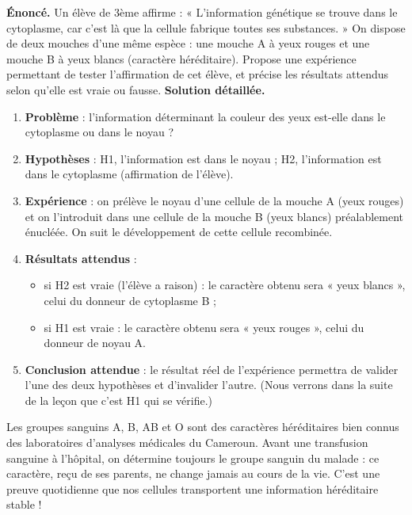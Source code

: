 \documentclass[11pt]{article}
\begin{document}
\begin{exoresolu}
\textbf{Énoncé.} Un élève de 3ème affirme : « L'information génétique se trouve dans le cytoplasme, car c'est là que la cellule fabrique toutes ses substances. » On dispose de deux mouches d'une même espèce : une mouche A à yeux rouges et une mouche B à yeux blancs (caractère héréditaire). Propose une expérience permettant de tester l'affirmation de cet élève, et précise les résultats attendus selon qu'elle est vraie ou fausse.
\tcblower
\textbf{Solution détaillée.}
\begin{enumerate}
\item \textbf{Problème} : l'information déterminant la couleur des yeux est-elle dans le cytoplasme ou dans le noyau ?
\item \textbf{Hypothèses} : H1, l'information est dans le noyau ; H2, l'information est dans le cytoplasme (affirmation de l'élève).
\item \textbf{Expérience} : on prélève le noyau d'une cellule de la mouche A (yeux rouges) et on l'introduit dans une cellule de la mouche B (yeux blancs) préalablement énucléée. On suit le développement de cette cellule recombinée.
\item \textbf{Résultats attendus} :
\begin{itemize}
\item si H2 est vraie (l'élève a raison) : le caractère obtenu sera « yeux blancs », celui du donneur de cytoplasme B ;
\item si H1 est vraie : le caractère obtenu sera « yeux rouges », celui du donneur de noyau A.
\end{itemize}
\item \textbf{Conclusion attendue} : le résultat réel de l'expérience permettra de valider l'une des deux hypothèses et d'invalider l'autre. (Nous verrons dans la suite de la leçon que c'est H1 qui se vérifie.)
\end{enumerate}
\end{exoresolu}

\begin{savaistu}[Et au Cameroun ?]
Les groupes sanguins A, B, AB et O sont des caractères héréditaires bien connus des laboratoires d'analyses médicales du Cameroun. Avant une transfusion sanguine à l'hôpital, on détermine toujours le groupe sanguin du malade : ce caractère, reçu de ses parents, ne change jamais au cours de la vie. C'est une preuve quotidienne que nos cellules transportent une information héréditaire stable !
\end{savaistu}
\end{document}
